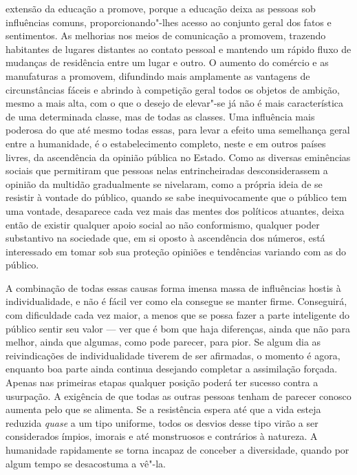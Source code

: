 extensão da educação a promove, porque a educação deixa as pessoas sob
influências comuns, proporcionando"-lhes acesso ao conjunto geral dos fatos
e sentimentos. As melhorias nos meios de comunicação a promovem, \mbox{trazendo}
habitantes de lugares distantes ao contato pessoal e mantendo um rápido
fluxo de mudanças de residência entre um lugar e outro. O aumento do
comércio e as manufaturas a promovem, difundindo mais amplamente as
vantagens de circunstâncias fáceis e abrindo à competição geral todos os
objetos de ambição, mesmo a mais alta, com o que o desejo de elevar"-se já
não é mais característica de uma determinada classe, mas de todas as
classes. Uma influência mais poderosa do que até mesmo todas essas, para
levar a efeito uma semelhança geral entre a humanidade, é o
estabelecimento completo, neste e em outros países livres, da ascendência
da opinião pública no Estado. Como as diversas eminências sociais que
permitiram que pessoas nelas entrincheiradas 
desconsiderassem a opinião da multidão gradualmente se nivelaram, 
como a própria ideia de se resistir à vontade do público, quando se sabe
inequivocamente que o público tem uma vontade, desaparece cada vez mais
das mentes dos políticos atuantes, deixa então de existir qualquer apoio
social ao não conformismo, qualquer poder substantivo na sociedade que,
em si oposto à ascendência dos números, está interessado em tomar sob sua
proteção opiniões e tendências variando com as do público.

A combinação de todas essas causas forma imensa massa de influências hostis
à individualidade, e não é fácil ver como ela consegue se manter firme.
Conseguirá, com dificuldade cada vez maior, a menos que se possa fazer a
parte inteligente do público sentir seu valor --- ver que é bom que haja
diferenças, ainda que não para melhor, ainda que algumas, como pode
parecer, para pior. Se algum dia as reivindicações de individualidade
tiverem de ser afirmadas, o momento é agora, enquanto boa parte ainda
continua desejando completar a assimilação forçada. Apenas nas primeiras
etapas qualquer posição poderá ter sucesso contra a usurpação. A exigência
de que todas as outras pessoas tenham de parecer conosco aumenta pelo que
se alimenta. Se a resistência espera até que a vida esteja reduzida \textit{quase}
a um tipo uniforme, todos os desvios desse tipo virão a ser considerados
ímpios, imorais e até monstruosos e contrários à natureza. A humanidade
rapidamente se torna incapaz de conceber a diversidade, quando por algum
tempo se desacostuma a \mbox{vê"-la}.

